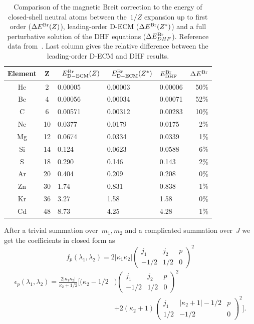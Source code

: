 \begin{table}[t]
\centering
\begin{tabular}{cc|lllr}
	Element & Z &~$E^{\rm{Br}}_{\rm{D-ECM}}(Z)$ &~$E^{\rm{Br}}_{\rm{D-ECM}}(Z^*)$ & $E^{\rm{Br}}_{\rm{DHF}}$ & $ \Delta E^{\rm{Br}}$\\
	\hline
	\hline 
	He & 2 & 0.00005 & 0.00003 & 0.00006 & 50\% \\
	Be & 4 & 0.00056 & 0.00034 & 0.00071 & 52\%\\
	C & 6 & 0.00571 & 0.00312  & 0.00283 & 10\%\\
	Ne & 10 & 0.0377 & 0.0179 & 0.0175 & 2\%\\
	Mg & 12 & 0.0674 & 0.0334 & 0.0339 & 1\%\\
	Si & 14 & 0.124 & 0.0623 & 0.0588 & 6\%\\
	S & 18 & 0.290 & 0.146 & 0.143 & 2\%\\
	Ar & 20 & 0.404 & 0.209 & 0.208 & 0\%\\
	Zn & 30 & 1.74 & 0.831 & 0.838 & 1\% \\
	Kr & 36 & 3.27 & 1.58 & 1.58 & 0\% \\
	Cd & 48 & 8.73 & 4.25 & 4.28 & 1\% 
	 \\
	\hline
\end{tabular}
	\caption{Comparison of the magnetic Breit correction to the energy of closed-shell neutral atoms between the~$1/Z$ expansion up to first order ($\Delta E^{\rm{Br}}(Z)$), leading-order D-ECM ($\Delta E^{\rm{Br}}(Z^*)$) and a full perturbative solution of the DHF equations ($\Delta E^{\rm{Br}}_{DHF}$). Reference data from~\cite{DESCLAUX1973311}. Last column gives the relative difference between the leading-order D-ECM and DHF results.}
	\label{tab:Breit}
\end{table}

After a trivial summation over~$m_1,m_2$ and a complicated summation over~$J$ we get the coefficients in closed form as
\begin{equation}
f_p(\lambda_1,\lambda_2)=2|\kappa_1 \kappa_2|
\begin{pmatrix} j_1 & j_2 & p \\ -1/2 & 1/2 & 0 \end{pmatrix}^2
\end{equation}
\begin{align}
\epsilon_p(\lambda_1,\lambda_2)=\frac{2|\kappa_1 \kappa_2|}{\kappa_2+1/2}\Big[(\kappa_2-1/2&)
\begin{pmatrix} j_1 & j_2 & p \\ -1/2 & 1/2 & 0 \end{pmatrix}^2 \nonumber
\\
&+2(\kappa_2+1)
\begin{pmatrix} j_1 & |\kappa_2+1|-1/2 & p \\ 1/2 & -1/2 & 0 \end{pmatrix}^2\Big].
\end{align}

